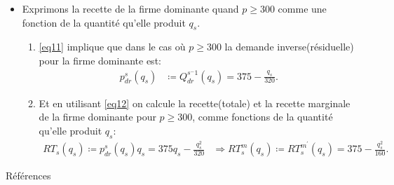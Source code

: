 \begin{frame}
\begin{itemize}
\begin{align}
\begin{array}{ll}
60000 - 120p & \text{sinon}.
\end{array}\right.
\label{eq11}
\end{align}
\item Exprimons la recette de la firme dominante quand $p\geq 300$ comme une fonction de la quantité qu'elle produit $q_s$.
\begin{enumerate}[$\cdot$]
   \item \eqref{eq11}  implique que dans le cas où $p\geq 300$ la demande inverse(résiduelle) pour la firme dominante est:
   \begin{align}
   p_{dr}^s(q_s) &\coloneqq Q_{dr}^{s^-1}(q_s) = 375 - \frac{q_s}{320}\label{eq12}.
   \end{align}
   \item Et en utilisant \eqref{eq12} on calcule la recette(totale) et  la recette marginale de la firme dominante pour $p\geq 300$, comme fonctions de la quantité qu'elle produit $q_s$:
   \begin{align*}
   RT_s(q_s) \coloneqq  p_{dr}^s(q_s)q_s = 375q_s - \frac{q_s^2}{320}&\Rightarrow RT_s^m(q_s) \coloneqq RT_s^{m^\prime}(q_s) = 375-  \frac{q_s^2}{160}.
   \end{align*}
\end{enumerate}
   \end{itemize}
 \end{frame}
\begin{frame}[allowframebreaks]{Références}


\end{frame}


